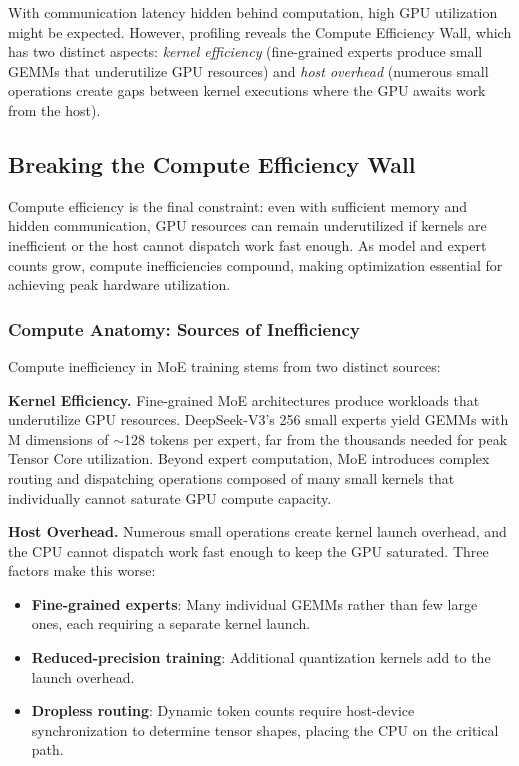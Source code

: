 \documentclass[10pt,logo,copyright]{nvidiatechreport}
\begin{document}
With communication latency hidden behind computation, high GPU utilization might be expected. However, profiling reveals the Compute Efficiency Wall, which has two distinct aspects: \textit{kernel efficiency} (fine-grained experts produce small GEMMs that underutilize GPU resources) and \textit{host overhead} (numerous small operations create gaps between kernel executions where the GPU awaits work from the host).

\subsection{Breaking the Compute Efficiency Wall}\label{sec:compute-wall}

Compute efficiency is the final constraint: even with sufficient memory and hidden communication, GPU resources can remain underutilized if kernels are inefficient or the host cannot dispatch work fast enough. As model and expert counts grow, compute inefficiencies compound, making optimization essential for achieving peak hardware utilization.

\subsubsection{Compute Anatomy: Sources of Inefficiency}

Compute inefficiency in MoE training stems from two distinct sources:

\textbf{Kernel Efficiency.} Fine-grained MoE architectures produce workloads that underutilize GPU resources. DeepSeek-V3's 256 small experts yield GEMMs with M dimensions of $\sim$128 tokens per expert, far from the thousands needed for peak Tensor Core utilization. Beyond expert computation, MoE introduces complex routing and dispatching operations composed of many small kernels that individually cannot saturate GPU compute capacity.

\textbf{Host Overhead.} Numerous small operations create kernel launch overhead, and the CPU cannot dispatch work fast enough to keep the GPU saturated. Three factors make this worse:
\begin{itemize}
    \item \textbf{Fine-grained experts}: Many individual GEMMs rather than few large ones, each requiring a separate kernel launch.
    \item \textbf{Reduced-precision training}: Additional quantization kernels add to the launch overhead.
    \item \textbf{Dropless routing}: Dynamic token counts require host-device synchronization to determine tensor shapes, placing the CPU on the critical path.
\end{itemize}
\end{document}
